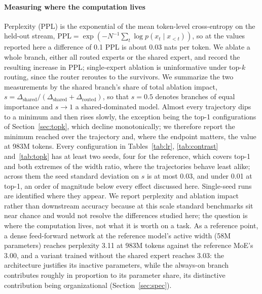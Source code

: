 \documentclass[conference,11pt]{IEEEtran}
\begin{document}
\paragraph{Measuring where the computation lives} Perplexity (PPL) is the exponential of the mean
token-level cross-entropy on the held-out stream, $\mathrm{PPL} = \exp(-N^{-1}\sum_t \log p(x_t
\mid x_{<t}))$, so at the values reported here a difference of 0.1 PPL is about 0.03 nats per
token. We ablate a whole branch, either all routed experts or the shared expert, and record the
resulting increase in PPL; single-expert ablation is uninformative under top-$k$ routing, since
the router reroutes to the survivors. We
summarize the two measurements by the shared branch's share of total ablation impact,
$s = \Delta_{\text{shared}}/(\Delta_{\text{shared}} + \Delta_{\text{routed}})$, so that $s=0.5$
denotes branches of equal importance and $s\rightarrow1$ a shared-dominated model. Almost every
trajectory dips to a minimum and then rises slowly, the exception being the top-1 configurations
of Section~\ref{sec:topk}, which decline monotonically; we therefore report the minimum reached
over the trajectory and, where the endpoint matters, the value at 983M tokens. Every configuration
in Tables~\ref{tab:lr}, \ref{tab:contrast} and~\ref{tab:topk} has at least two seeds, four for
the reference, which covers top-1 and both extremes of the width ratio, where the trajectories
behave least alike; across them the seed standard deviation on $s$ is at most 0.03, and under
0.01 at top-1, an order of magnitude below every effect discussed here. Single-seed runs are
identified where they appear. We report perplexity and ablation impact rather than downstream
accuracy because at this scale standard benchmarks sit near chance and would not resolve the
differences studied here; the question is where the computation lives, not what it is worth on a task.
As a reference point, a dense feed-forward network at the reference model's active width (58M parameters) reaches perplexity 3.11 at 983M tokens against the reference MoE's
3.00, and a variant trained without the shared expert reaches 3.03: the architecture justifies its inactive parameters, while the always-on branch contributes roughly in proportion to its parameter share, its distinctive contribution being organizational (Section~\ref{sec:spec}).
\end{document}

